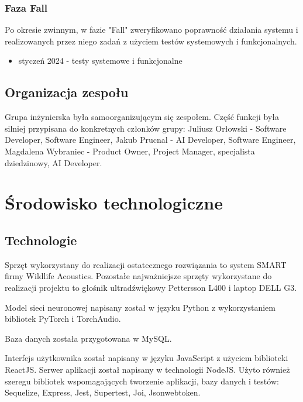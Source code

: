 \documentclass{sprz}
\begin{document}
\subsubsection{Faza Fall}
Po okresie zwinnym, w fazie "Fall" zweryfikowano poprawność działania systemu i realizowanych przez niego zadań z użyciem testów systemowych i funkcjonalnych.
\begin{itemize}
  \item{styczeń 2024 - testy systemowe i funkcjonalne}
  \end{itemize}


\subsection{Organizacja zespołu}
Grupa inżynierska była samoorganizującym się zespołem. Część funkcji była silniej przypisana do konkretnych członków grupy:
Juliusz Orłowski - Software Developer, Software Engineer, Jakub Prucnal - AI Developer, Software Engineer, Magdalena Wybraniec - Product Owner, Project Manager, specjalista dziedzinowy, AI Developer. 



\section{Środowisko technologiczne}

\subsection{Technologie}
Sprzęt wykorzystany do realizacji ostatecznego rozwiązania to system SMART firmy Wildlife Acoustics. Pozostałe najważniejsze sprzęty wykorzystane do realizacji projektu to głośnik ultradźwiękowy Pettersson L400 i laptop DELL G3.

Model sieci neuronowej napisany został w języku Python z wykorzystaniem bibliotek PyTorch i TorchAudio.

Baza danych została przygotowana w MySQL.

Interfejs użytkownika został napisany w języku JavaScript z użyciem biblioteki ReactJS. Serwer aplikacji został napisany w technologii NodeJS. Użyto również szeregu bibliotek wspomagających tworzenie aplikacji, bazy danych i testów: Sequelize, Express, Jest, Supertest, Joi, Jsonwebtoken. 
\end{document}
